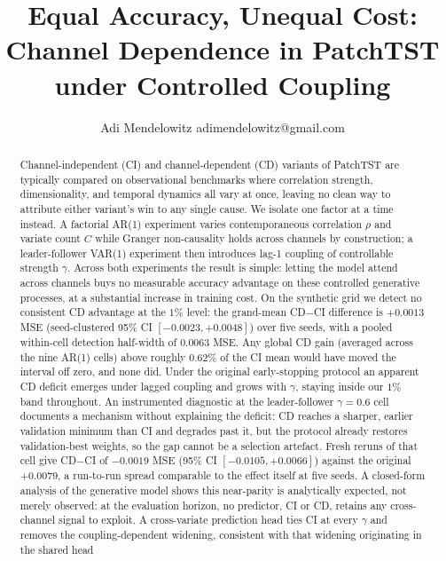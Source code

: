 \documentclass[10pt]{article} %
\title{Equal Accuracy, Unequal Cost: \\ Channel Dependence in PatchTST under Controlled Coupling}
\author{\name Adi Mendelowitz \email adimendelowitz@gmail.com}
\begin{document}
    \maketitle

    \begin{abstract}
        Channel-independent (CI) and channel-dependent (CD) variants of PatchTST are typically compared on observational
        benchmarks where correlation strength, dimensionality, and temporal dynamics all vary at once, leaving no clean way
        to attribute either variant's win to any single cause. We isolate one factor at a time instead. A factorial AR(1)
        experiment varies contemporaneous correlation $\rho$ and variate count $C$ while Granger non-causality holds across
        channels by construction; a leader-follower VAR(1) experiment then introduces lag-1 coupling of controllable strength
        $\gamma$. Across both experiments the result is simple: letting the model attend across channels buys no measurable
        accuracy advantage on these controlled generative processes, at a substantial increase in training cost. On the synthetic
        grid we detect no consistent CD advantage at the $1\%$ level: the grand-mean CD$-$CI difference is $+0.0013$ MSE
        (seed-clustered 95\% CI $[-0.0023, +0.0048]$) over five seeds, with a pooled within-cell detection half-width of 0.0063
        MSE. Any global CD gain (averaged across the nine AR(1) cells) above roughly $0.62\%$ of the CI mean would have moved the
        interval off zero, and none did. Under the original early-stopping protocol an apparent CD deficit emerges under lagged
        coupling and grows with $\gamma$, staying inside our $1\%$ band throughout. An instrumented diagnostic at the
        leader-follower $\gamma=0.6$ cell documents a mechanism without explaining the deficit: CD reaches a sharper, earlier
        validation minimum than CI and degrades past it, but the protocol already restores validation-best weights, so the gap
        cannot be a selection artefact. Fresh reruns of that cell give CD$-$CI of $-0.0019$ MSE (95\% CI $[-0.0105, +0.0066]$)
        against the original $+0.0079$, a run-to-run spread comparable to the effect itself at five seeds. A closed-form analysis
        of the generative model shows this near-parity is analytically expected, not merely observed: at the evaluation horizon,
        no predictor, CI or CD, retains any cross-channel signal to exploit. A cross-variate prediction head ties CI at every
        $\gamma$ and removes the coupling-dependent widening, consistent with that widening originating in the shared head

\end{abstract}
\end{document}
